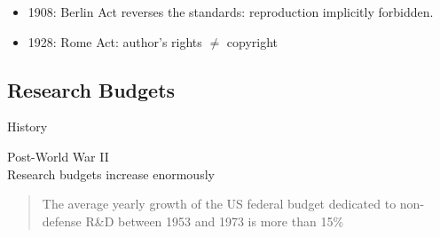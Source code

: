 \documentclass[10pt,compress,serif,aspectratio=169]{beamer}
\begin{document}
\begin{frame}[t]
\begin{itemize}
 \item 1908: Berlin Act reverses the standards: reproduction implicitly forbidden. %
 \item 1928: Rome Act: author’s rights $\neq$ copyright
 \end{itemize}
\end{frame}


\subsection{Research Budgets}

\begin{frame}[t]{History}
{
 \begin{center}
   \Large Post-World War II\\ Research budgets increase enormously
 \end{center}
}
 \begin{quote}The average yearly growth of the US federal budget dedicated to non-defense R\&D between 1953 and 1973 is more than 15\%
 \end{quote}
\end{frame}
\end{document}
